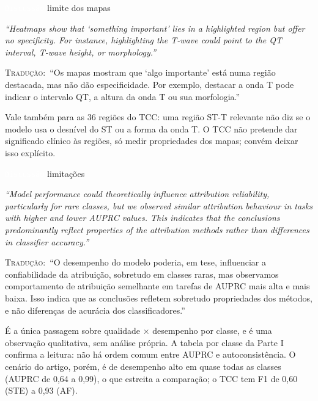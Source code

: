 \documentclass[11pt,a4paper]{article}
\newcommand{\pagechip}[1]{{\setlength{\fboxsep}{1.5pt}\colorbox{cAcc}{\textcolor{white}{\scriptsize\texttt{#1}}}}}
\newenvironment{origquote}{\par\itshape\small}{\par}
\newenvironment{tradquote}{\par\small\textsc{Tradução:}\ }{\par}
\newcommand{\explab}[1]{\par\smallskip{\small\color{cAcc}\textbf{\MakeUppercase{#1}}}\par}
\begin{document}
\begin{citacard}{\pagechip{Discussão} limite dos mapas}
\begin{origquote}“Heatmaps show that ‘something important’ lies in a highlighted region but offer no specificity. For instance, highlighting the T-wave could point to the QT interval, T-wave height, or morphology.”\end{origquote}
\begin{tradquote}“Os mapas mostram que ‘algo importante’ está numa região destacada, mas não dão especificidade. Por exemplo, destacar a onda T pode indicar o intervalo QT, a altura da onda T ou sua morfologia.”\end{tradquote}
\explab{Explicação}
Vale também para as 36 regiões do TCC: uma região ST-T relevante não diz se o modelo usa o desnível do ST ou a forma da onda T. O TCC não pretende dar significado clínico às regiões, só medir propriedades dos mapas; convém deixar isso explícito.
\end{citacard}

\begin{citacard}{\pagechip{Discussão} limitações}
\begin{origquote}“Model performance could theoretically influence attribution reliability, particularly for rare classes, but we observed similar attribution behaviour in tasks with higher and lower AUPRC values. This indicates that the conclusions predominantly reflect properties of the attribution methods rather than differences in classifier accuracy.”\end{origquote}
\begin{tradquote}“O desempenho do modelo poderia, em tese, influenciar a confiabilidade da atribuição, sobretudo em classes raras, mas observamos comportamento de atribuição semelhante em tarefas de AUPRC mais alta e mais baixa. Isso indica que as conclusões refletem sobretudo propriedades dos métodos, e não diferenças de acurácia dos classificadores.”\end{tradquote}
\explab{Explicação}
É a única passagem sobre qualidade $\times$ desempenho por classe, e é uma observação qualitativa, sem análise própria. A tabela por classe da Parte I confirma a leitura: não há ordem comum entre AUPRC e autoconsistência. O cenário do artigo, porém, é de desempenho alto em quase todas as classes (AUPRC de 0,64 a 0,99), o que estreita a comparação; o TCC tem F1 de 0,60 (STE) a 0,93 (AF).
\end{citacard}
\end{document}
